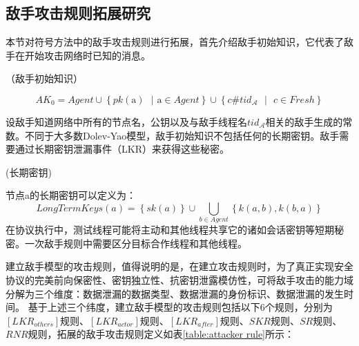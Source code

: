 \subsection{敌手攻击规则拓展研究}
本节对符号方法中的敌手攻击规则进行拓展，首先介绍敌手初始知识，它代表了敌手在开始攻击网络时已知的消息。

\begin{definition}{（敌手初始知识）}

	  \[A{{K}_{0}}=Agent\cup \left\{ pk\left( \text{a} \right)\text{ }\!\!|\!\!\text{ a}\in Agent \right\}\cup \left\{ c\#ti{{d}_{\mathcal{A}}}\text{ }\!\!|\!\!\text{ }c\in Fresh \right\}\]
\end{definition}

设敌手知道网络中所有的节点名，公钥以及与敌手线程名$ti{{d}_{\mathcal{A}}}$相关的敌手生成的常数。不同于大多数Dolev-Yao模型，敌手初始知识不包括任何的长期密钥。敌手需要通过长期密钥泄漏事件（LKR）来获得这些秘密。


\begin{definition}{(长期密钥)}


	节点a的长期密钥可以定义为：
	\[LongTermKeys\left( a \right)=\left\{ sk\left( a \right) \right\}\cup \bigcup\limits_{b\in Agent}{\left\{ k\left( a,b \right),k\left( b,a \right) \right\}}\]
	在协议执行中，测试线程可能将主动和其他线程共享它的诸如会话密钥等短期秘密。一次敌手规则中需要区分目标合作线程和其他线程。

\end{definition}


建立敌手模型的攻击规则，值得说明的是，在建立攻击规则时，为了真正实现安全协议的完美前向保密性、密钥独立性、抗密钥泄露模仿性，可将敌手攻击的能力域分解为三个维度：数据泄漏的数据类型、数据泄漏的身份标识、数据泄漏的发生时间。
基于上述三个纬度，建立敌手模型的攻击规则包括以下6个规则，分别为$\left[ LK{{R}_{others}} \right]$规则、$\left[ LK{{R}_{actor}} \right]$规则、$\left[ LK{{R}_{after}} \right]$规则、$SKR$规则、$SR$规则、$RNR$规则，拓展的敌手攻击规则定义如表\ref{table:attacker rule}所示：

